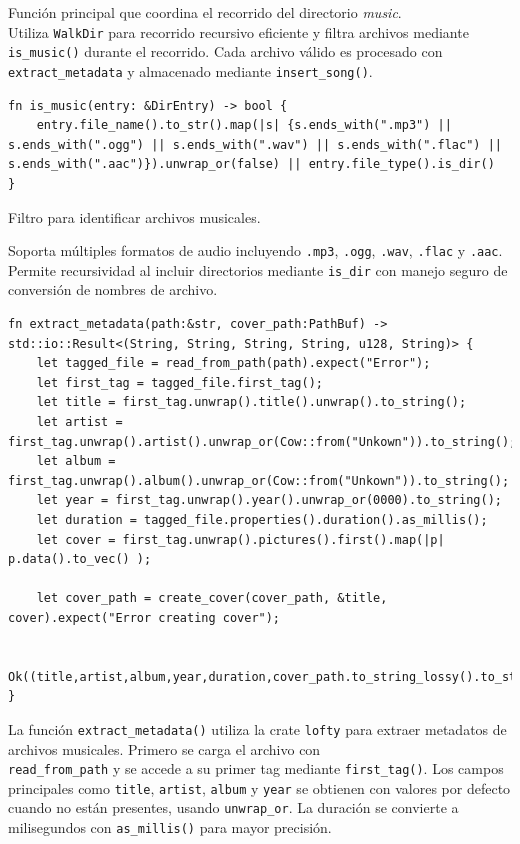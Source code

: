 \documentclass[11pt, a4paper]{article}
\begin{document}
            Función principal que coordina el recorrido del directorio \textit{music}. \\

            Utiliza \texttt{WalkDir} para recorrido recursivo eficiente y filtra archivos mediante \texttt{is\_music()} durante el recorrido. Cada archivo válido es procesado con \texttt{extract\_metadata} y almacenado mediante \texttt{insert\_song()}.

            \begin{lstlisting}[caption={fn is\_music()}]
fn is_music(entry: &DirEntry) -> bool {
    entry.file_name().to_str().map(|s| {s.ends_with(".mp3") || s.ends_with(".ogg") || s.ends_with(".wav") || s.ends_with(".flac") || s.ends_with(".aac")}).unwrap_or(false) || entry.file_type().is_dir()
}
            \end{lstlisting}

            Filtro para identificar archivos musicales.

            Soporta múltiples formatos de audio incluyendo \texttt{.mp3}, \texttt{.ogg}, \texttt{.wav}, \texttt{.flac} y \texttt{.aac}. Permite recursividad al incluir directorios mediante \texttt{is\_dir} con manejo seguro de conversión de nombres de archivo.

            \begin{lstlisting}[caption={fn extract\_metadata()}]
fn extract_metadata(path:&str, cover_path:PathBuf) -> std::io::Result<(String, String, String, String, u128, String)> {
    let tagged_file = read_from_path(path).expect("Error");
    let first_tag = tagged_file.first_tag();
    let title = first_tag.unwrap().title().unwrap().to_string();
    let artist = first_tag.unwrap().artist().unwrap_or(Cow::from("Unkown")).to_string();
    let album = first_tag.unwrap().album().unwrap_or(Cow::from("Unkown")).to_string();
    let year = first_tag.unwrap().year().unwrap_or(0000).to_string();
    let duration = tagged_file.properties().duration().as_millis();
    let cover = first_tag.unwrap().pictures().first().map(|p| p.data().to_vec() );

    let cover_path = create_cover(cover_path, &title, cover).expect("Error creating cover");

    Ok((title,artist,album,year,duration,cover_path.to_string_lossy().to_string()))
}
            \end{lstlisting}

            La función \texttt{extract\_metadata()} utiliza la crate \texttt{lofty} para extraer metadatos de archivos musicales. Primero se carga el archivo con \\ \texttt{read\_from\_path} y se accede a su primer tag mediante \texttt{first\_tag()}. Los campos principales como \texttt{title}, \texttt{artist}, \texttt{album} y \texttt{year} se obtienen con valores por defecto cuando no están presentes, usando \texttt{unwrap\_or}. La duración se convierte a milisegundos con \texttt{as\_millis()} para mayor precisión.
\end{document}
